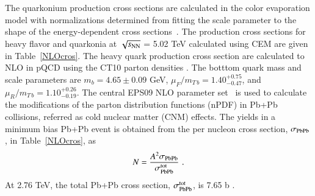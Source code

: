 The quarkonium production cross sections are calculated in the color evaporation model with
normalizations determined from fitting the scale parameter to the shape of the energy-dependent
cross sections~\cite{Nelson:2012bc}.
The production cross sections for heavy flavor and quarkonia at $\sqrt{s_{\rm NN}}$ = 5.02 
TeV \cite{Kumar:2012qx} calculated using CEM are given in Table~\ref{NLOcros}.
 The heavy quark production cross section are calculated to NLO in pQCD  
 using the CT10 parton densities \cite{Lai:2010vv}.
 The botttom quark mass and scale parameters are $m_b = 4.65 \pm 0.09$ GeV,
$\mu_F/m_{T\, b} = 1.40^{+0.75}_{-0.47}$, and $\mu_R/m_{T\, b} = 1.10^{+0.26}_{-0.19}$.
The central EPS09 NLO parameter set~\cite{Eskola:2009uj} is used to 
calculate the modifications of the parton distribution functions (nPDF) in 
Pb+Pb collisions, referred as cold nuclear matter (CNM) effects.
The yields in a minimum bias 
Pb+Pb event is obtained from the per nucleon cross
section, $\sigma_{\rm PbPb}$, in Table~\ref{NLOcros}, as
\begin{eqnarray}
N = {A^2 \sigma_{\rm PbPb} \over  
\sigma_{\rm PbPb}^{\rm tot}} \, \, .
\end{eqnarray}
 At 2.76 TeV, the total Pb+Pb cross section, $\sigma_{\rm PbPb}^{\rm tot}$, 
is 7.65 b \cite{Chatrchyan:2011sx}.


%
%




